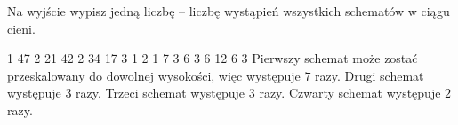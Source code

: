 
Na wyjście wypisz jedną liczbę -- liczbę wystąpień wszystkich schematów w ciągu cieni.



1 47
2 21 42
2 34 17
3 1 2 1
7 3 6 3 6 12 6 3
\sampleCOMMENT
Pierwszy schemat może zostać przeskalowany do dowolnej wysokości, więc występuje $7$ razy.
Drugi schemat występuje $3$ razy.
Trzeci schemat występuje $3$ razy.
Czwarty schemat występuje $2$ razy.
\sampleEND



